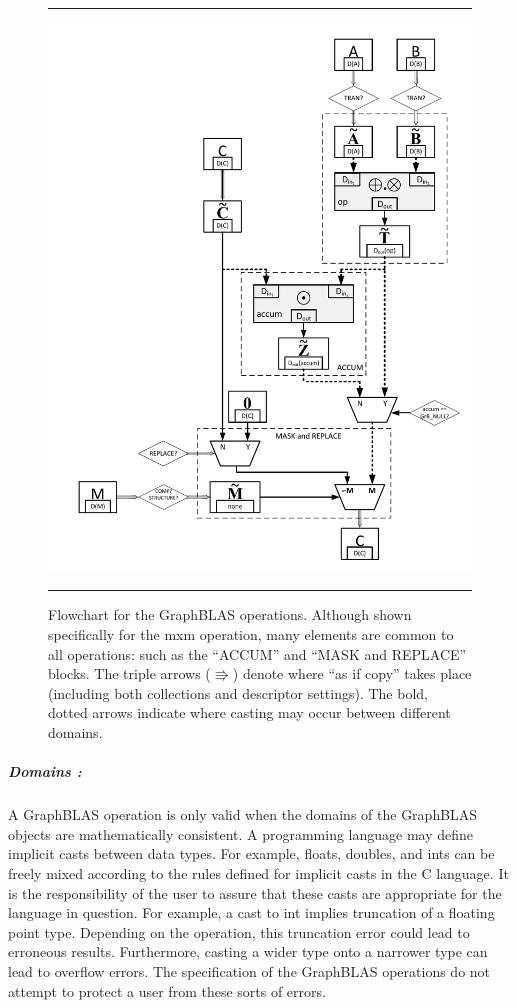 \begin{figure}[p]
    \hrule
    \begin{center}
        \includegraphics[width=5.5in]{mxm_operation_flowchart_1_3d.pdf}
    \end{center}
    \caption[Flowchart for the GraphBLAS operations.]{Flowchart for the GraphBLAS operations. Although shown specifically for
	the {\sf mxm} operation, many elements are common to all operations: such as the 
	``{\sf ACCUM}'' and ``{\sf MASK and REPLACE}'' blocks.  The triple arrows 
    ($\Rrightarrow$) denote where ``as if copy'' takes place (including both 
    collections and descriptor settings).  The bold, dotted arrows indicate
    where casting may occur between different domains.}
    \label{Fig:mxmFlowchart}
    \hrule
\end{figure}

\subparagraph{Domains :}
A GraphBLAS operation is only valid when the domains of the GraphBLAS objects are
mathematically consistent.  A programming language may define implicit casts 
between data types.  For example, {\sf float}s, {\sf double}s, and {\sf int}s can be 
freely mixed according to the rules defined for implicit casts in the C language.  It is the 
responsibility of the user to assure that these casts are appropriate for the language
in question.  For example, a cast to {\sf int} implies truncation of a floating 
point type.  Depending on the operation, this truncation error could lead to
erroneous results.  Furthermore, casting a wider type onto a narrower type can lead 
to overflow errors.  The specification of the GraphBLAS operations do not attempt to 
protect a user from these sorts of errors.

